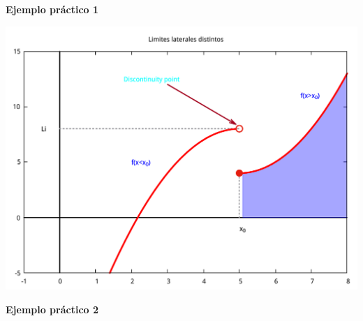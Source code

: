 \documentclass[11.5pt,a4paper]{article}
\begin{document}
\newpage
\textbf{Ejemplo práctico 1}

\includegraphics[scale=0.40]{ejemplo4.pdf} 

\textbf{Ejemplo práctico 2}
\end{document}
